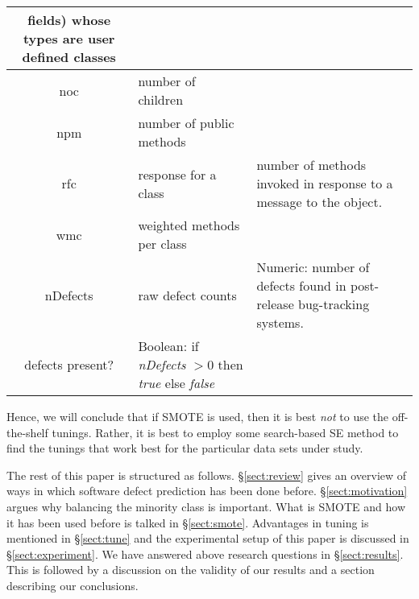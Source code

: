\documentclass[sigconf]{acmart}
\theoremstyle{break}
\newcommand{\tion}[1]{{\S}\ref{sect:#1}}
\begin{document}
\begin{figure*}[t!]
\begin{center}
{\begin{tabular}{c|l|p{4.0in}}
fields) whose types are user defined classes\\
\hline
noc & number of children &\\
\hline
npm & number of public methods & \\
\hline
rfc & response for a class &number of methods invoked in response to
a message to the object.\\
\hline
wmc & weighted methods per class &\\
\hline
\rowcolor{lightgray}
nDefects & raw defect counts & Numeric: number of defects found in post-release bug-tracking systems.\\
\rowcolor{lightgray}
defects present? & Boolean: if {\em nDefects} $>0$ then {\em true} else {\em false}
\end{tabular}
}
\end{center}
\caption{OO code metrics used for all studies in this paper.
Last lines, shown in \textcolor{gray} denote the dependent variables.}\label{fig:ck}
\end{figure*}

Hence, we will conclude that if SMOTE is used,
then it is best {\em not} to use the off-the-shelf tunings. Rather, it is best to employ some search-based
SE method to find the tunings that work best for the
particular data sets under study.

The rest of this paper is structured as follows.
\tion{review} gives an overview of ways in which software defect prediction has been done before. \tion{motivation} argues why balancing the minority class is important.
What is SMOTE and how it has been used before is talked in \tion{smote}. Advantages in tuning is mentioned in \tion{tune}
and the experimental setup of this paper is discussed in \tion{experiment}.
We have answered above research questions in
\tion{results}. This is followed by a discussion on the validity of our results and a section
describing our conclusions.


 


\end{document}
